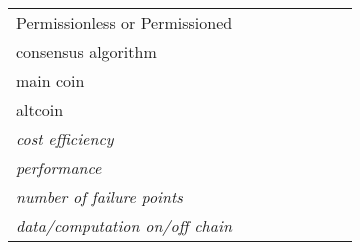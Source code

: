 \begin{tabular}{m{2.8cm}lllllll}
\multicolumn{8}{l}{\cellcolor[HTML]{C0C0C0}Permissionless or Permissioned}                                                                                                                                                                                                                                                                                                       \\
consensus algorithm                         &                                              &                                               &                                          &                                           &                                            &                                                  &                                              \\
main coin                                   &                                              &                                               &                                          &                                           &                                            &                                                  &                                              \\
altcoin                                     &                                              &                                               &                                          &                                           &                                            &                                                  &                                              \\
\textit{cost efficiency}                    &                                              &                                               &                                          &                                           &                                            &                                                  &                                              \\
\textit{performance}                        &                                              &                                               &                                          &                                           &                                            &                                                  &                                              \\
\textit{number of failure points}           &                                              &                                               &                                          &                                           &                                            &                                                  &                                              \\
\textit{data/computation on/off chain}      &                                              &                                               &                                          &                                           &                                            &                                                  &                                             
\end{tabular}
